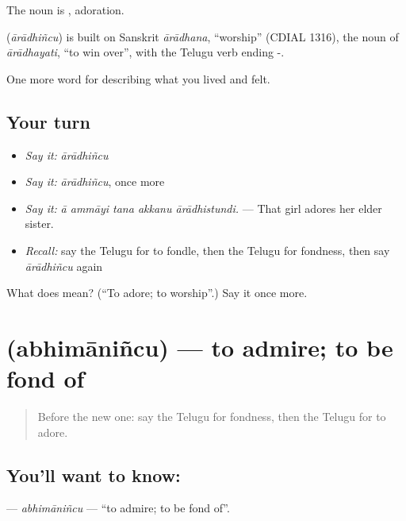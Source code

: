 The noun is , adoration.

\begin{cousinweb}
\textbf{} (\emph{ārādhiñcu}) is built on Sanskrit \emph{ārādhana}, \textquotedblleft{}worship\textquotedblright{} (CDIAL 1316), the noun of \emph{ārādhayati}, \textquotedblleft{}to win over\textquotedblright{}, with the Telugu verb ending -.
\end{cousinweb}

\begin{grammarlens}[title={What you've built}]
One more word for describing what you lived and felt.
\end{grammarlens}

\subsection*{Your turn}
\begin{itemize}
\raggedright
  \item \emph{Say it:} \emph{ārādhiñcu}
  \item \emph{Say it:} \emph{ārādhiñcu}, once more
  \item \emph{Say it:} \emph{ā ammāyi tana akkanu ārādhistundi.} — That girl adores her elder sister.
  \item \emph{Recall:} say the Telugu for to fondle, then the Telugu for fondness, then say \emph{ārādhiñcu} again
\end{itemize}

\begin{tcolorbox}[breakable,colback=teal!4,colframe=teal!35!black,title={Before you move on}]
What does  mean? (\textquotedblleft{}To adore; to worship\textquotedblright{}.) Say it once more.
\end{tcolorbox}
\section[\texorpdfstring{\te{అభిమానించు} (abhimāniñcu)}{అభిమానించు (abhimāniñcu)}]{ (abhimāniñcu) — to admire; to be fond of}

\label{lesson:TE-C504-abhimanincu}



\begin{quote}
Before the new one: say the Telugu for fondness, then the Telugu for to adore.
\end{quote}

\subsection*{You'll want to know: }
\textbf{} — \emph{abhimāniñcu} — \textquotedblleft{}to admire; to be fond of\textquotedblright{}.

